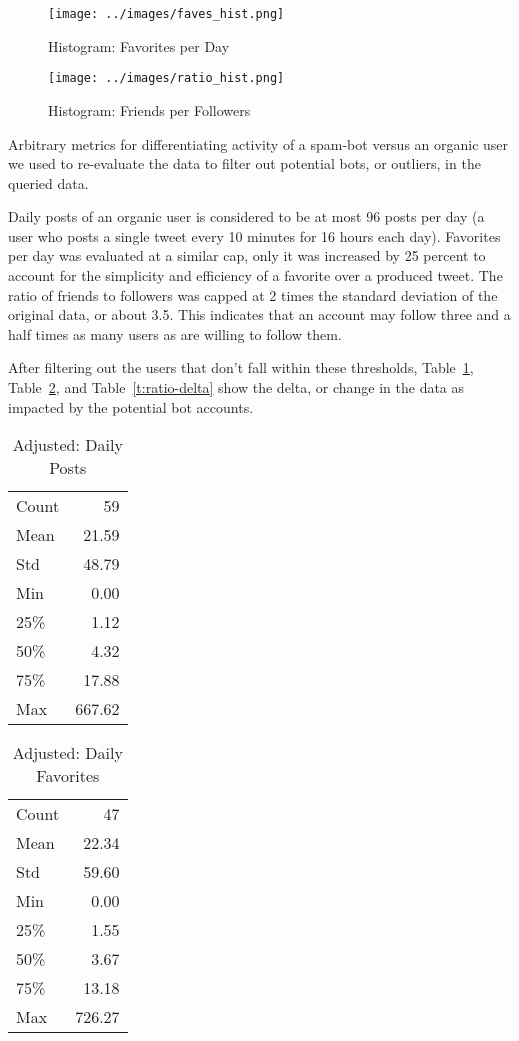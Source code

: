 \begin{figure}[!ht]
  \centering\texttt{[image: ../images/faves\_hist.png]}
  \caption{Histogram: Favorites per Day}\label{f:faves-hist}
\end{figure}

\begin{figure}[!ht]
  \centering\texttt{[image: ../images/ratio\_hist.png]}
  \caption{Histogram: Friends per Followers}\label{f:ratio-hist}
\end{figure}

Arbitrary metrics for differentiating activity of a spam-bot versus an organic
user we used to re-evaluate the data to filter out potential bots, or outliers,
in the queried data.

Daily posts of an organic user is considered to be at most 96 posts per day (a
user who posts a single tweet every 10 minutes for 16 hours each day).
Favorites per day was evaluated at a similar cap, only it was increased by 25
percent to account for the simplicity and efficiency of a favorite over a
produced tweet.  The ratio of friends to followers was capped at 2 times the
standard deviation of the original data, or about 3.5. This indicates that an
account may follow three and a half times as many users as are willing to
follow them. 

After filtering out the users that don't fall within these thresholds,
Table~\ref{t:post-delta}, Table~\ref{t:faves-delta}, and
Table~\ref{t:ratio-delta} show the delta, or change in the data as impacted by
the potential bot accounts.

\begin{table}[htb]
\centering
\caption{Adjusted: Daily Posts}
\label{t:post-delta}
\begin{tabular}{lr}
Count & 59  \\
Mean  & 21.59  \\
Std   & 48.79  \\
Min   & 0.00   \\
25\%  & 1.12   \\
50\%  & 4.32   \\
75\%  & 17.88  \\
Max   & 667.62
\end{tabular}
\end{table}

\begin{table}[htb]
\centering
\caption{Adjusted: Daily Favorites}
\label{t:faves-delta}
\begin{tabular}{lr}
Count & 47  \\
Mean  & 22.34  \\
Std   & 59.60  \\
Min   & 0.00   \\
25\%  & 1.55   \\
50\%  & 3.67   \\
75\%  & 13.18  \\
Max   & 726.27
\end{tabular}
\end{table}

